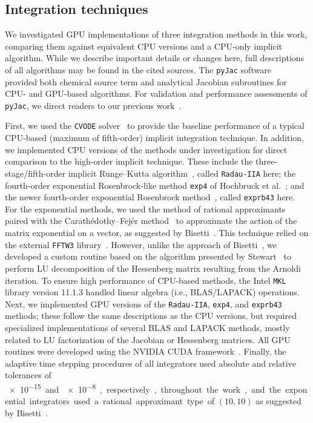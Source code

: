 \documentclass[final,twocolumn]{elsarticle}
\begin{document}
\subsection{Integration techniques}

We investigated GPU implementations of three integration methods in this work, comparing them against equivalent CPU versions and a CPU-only implicit algorithm.
While we describe important details or changes here, full descriptions of all algorithms may be found in the cited sources.
The \texttt{pyJac} software~\cite{Niemeyer:2015im,Niemeyer:2015ws} provided both chemical source term and analytical Jacobian subroutines for CPU- and GPU-based algorithms.
For validation and performance assessments of \texttt{pyJac}, we direct readers to our previous work~\cite{Niemeyer:2015ws}.

First, we used the \texttt{CVODE} solver~\cite{Hindmarsh:2005hg} to provide the baseline performance of a typical CPU-based (maximum of fifth-order) implicit integration technique.
In addition, we implemented CPU versions of the methods under investigation for direct comparison to the high-order implicit technique.
These include the three-stage/fifth-order implicit Runge--Kutta algorithm~\cite{wanner1991solving}, called \texttt{Radau-IIA} here; the fourth-order exponential Rosenbrock-like method \texttt{exp4} of Hochbruck et al.~\cite{Hochbruck:1998}; and the newer fourth-order exponential Rosenbrock method~\cite{Hockbruck:2009}, called \texttt{exprb43} here.
For the exponential methods, we used the method of rational approximants~\cite{gallopoulos:1992} paired with the Carath\'edothy--Fej\'er method~\cite{trefethen:2006} to approximate the action of the matrix exponential on a vector, as suggested by Bisetti~\cite{Bisetti:2012jw}.
This technique relied on the external \texttt{FFTW3} library~\cite{frigo2005design}.
However, unlike the approach of Bisetti~\cite{Bisetti:2012jw}, we developed a custom routine based on the algorithm presented by Stewart~\cite{stewart:1998} to perform LU decomposition of the Hessenberg matrix resulting from the Arnoldi iteration.
To ensure high performance of CPU-based methods, the Intel \texttt{MKL} library version 11.1.3 handled linear algebra (i.e., BLAS/LAPACK) operations.
Next, we implemented GPU versions of the \texttt{Radau-IIA}, \texttt{exp4}, and \texttt{exprb43} methods; these follow the same descriptions as the CPU versions, but required specialized implementations of several BLAS and LAPACK methods, mostly related to LU factorization of the Jacobian or Hessenberg matrices.
All GPU routines were developed using the NVIDIA CUDA framework~\cite{Buck:2008aa,NVIDIA:2015aa}.
Finally, the adaptive time stepping procedures of all integrators used absolute and relative tolerances of \SI{e-15} and \SI{e-8}, respectively, throughout the work, and the exponential integrators used a rational approximant type of $\left(10,10\right)$ as suggested by Bisetti~\cite{Bisetti:2012jw}.
\end{document}
